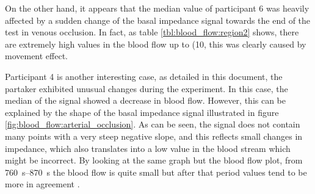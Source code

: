 On the other hand, it appears that the median value of participant 6 was heavily affected by a sudden change of the basal impedance signal towards the end of the test in venous occlusion. In fact, as table \ref{tbl:blood_flow:region2} shows, there are extremely high values in the blood flow up to (\SI{10}{\bfv}, this was clearly caused by movement effect. 

Participant 4 is another interesting case, as detailed in this document, the partaker exhibited unusual changes during the experiment. In this case, the median of the signal showed a decrease in blood flow. However, this can be explained by the shape of the basal impedance signal illustrated in figure \ref{fig:blood_flow:arterial_occlusion}. As can be seen, the signal does not contain many points with a very steep negative slope, and this reflects small changes in impedance, which also translates into a low value in the blood stream which might be incorrect. By looking at the same graph but the blood flow plot, from \SIrange{760}{870}{\second} the blood flow is quite small but after that period values tend to be more in agreement .

